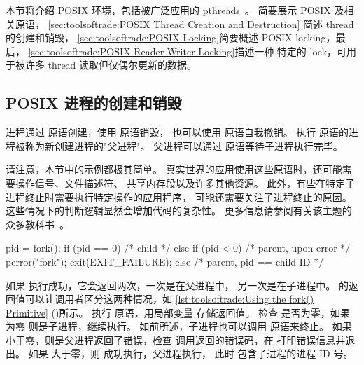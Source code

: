 本节将介绍 POSIX 环境，包括被广泛应用的
pthreads~\cite{OpenGroup1997pthreads}。
简要展示 POSIX  及相关原语，
\cref{sec:toolsoftrade:POSIX Thread Creation and Destruction}
简述 thread 的创建和销毁，
\cref{sec:toolsoftrade:POSIX Locking}简要概述
POSIX locking，最后，
\cref{sec:toolsoftrade:POSIX Reader-Writer Locking}描述一种
特定的 lock，可用于被许多 thread 读取但仅偶尔更新的数据。

\subsection{POSIX 进程的创建和销毁}
\label{sec:toolsoftrade:POSIX Process Creation and Destruction}

进程通过  原语创建，使用  原语销毁，
也可以使用  原语自我撤销。
执行  原语的进程被称为新创建进程的"父进程"。
父进程可以通过  原语等待子进程执行完毕。

请注意，本节中的示例都极其简单。
真实世界的应用使用这些原语时，还可能需要操作信号、文件描述符、
共享内存段以及许多其他资源。
此外，有些在特定子进程终止时需要执行特定操作的应用程序，
可能还需要关注子进程终止的原因。
这些情况下的判断逻辑显然会增加代码的复杂性。
更多信息请参阅有关该主题的众多教科书~\cite{WRichardStevens1992,StewartWeiss2013UNIX}。

\begin{listing}
\begin{fcvlabel}
\begin{VerbatimL}[commandchars=\%\[\]]
pid = fork();%
if (pid == 0) {%
	/* child */%
} else if (pid < 0) {%
	/* parent, upon error */%
	perror("fork");
	exit(EXIT_FAILURE);%
} else {
	/* parent, pid == child ID */%
}
\end{VerbatimL}
\end{fcvlabel}
\caption{使用  原语}
\label{lst:toolsoftrade:Using the fork() Primitive}
\end{listing}

\begin{fcvref}
如果  执行成功，它会返回两次，一次是在父进程中，
另一次是在子进程中。
 的返回值可以让调用者区分这两种情况，如
\cref{lst:toolsoftrade:Using the fork() Primitive}
()所示。
执行  原语，用局部变量
 存储返回值。
检查  是否为零，如果为零
则是子进程，继续执行。
如前所述，子进程也可以调用  原语来终止。
如果小于零，则是父进程返回了错误，检查
 调用返回的错误码，在
打印错误信息并退出。
如果  大于零，则  成功执行，父进程执行，
此时  包含子进程的进程 ID 号。
\end{fcvref}

